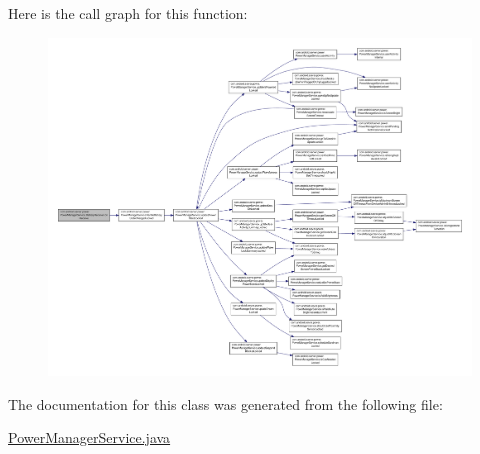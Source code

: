 Here is the call graph for this function\-:
\nopagebreak
\begin{figure}[H]
\begin{center}
\leavevmode
\includegraphics[width=350pt]{classcom_1_1android_1_1server_1_1power_1_1PowerManagerService_1_1BatteryReceiver_a6de53659a9ad464737178de62a15fc42_cgraph}
\end{center}
\end{figure}




The documentation for this class was generated from the following file\-:\begin{DoxyCompactItemize}
\item 
\hyperlink{PowerManagerService_8java}{Power\-Manager\-Service.\-java}\end{DoxyCompactItemize}
